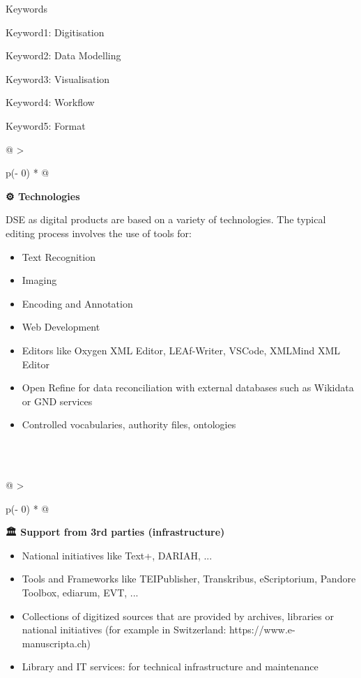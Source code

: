 \documentclass[
  letterpaper,
  DIV=11,
  numbers=noendperiod]{scrreprt}
\begin{document}
Keywords

Keyword1: Digitisation

Keyword2: Data Modelling

Keyword3: Visualisation

Keyword4: Workflow

Keyword5: Format

\begin{longtable}[]{@{}
  >{\raggedright\arraybackslash}p{(\columnwidth - 0\tabcolsep) * }@{}}
\toprule\noalign{}
\begin{minipage}[b]{\linewidth}\raggedright
\textbf{⚙️ Technologies} \textbar{}

DSE as digital products are based on a variety of technologies. The
typical editing process involves the use of tools for:

\begin{itemize}
\item
  Text Recognition
\item
  Imaging
\item
  Encoding and Annotation
\item
  Web Development
\item
  Editors like Oxygen XML Editor, LEAf-Writer, VSCode, XMLMind XML
  Editor
\item
  Open Refine for data reconciliation with external databases such as
  Wikidata or GND services
\item
  Controlled vocabularies, authority files, ontologies
\end{itemize}
\end{minipage} \\
\midrule\noalign{}
\endhead
\bottomrule\noalign{}
\endlastfoot
 \\
\end{longtable}

\begin{longtable}[]{@{}
  >{\raggedright\arraybackslash}p{(\columnwidth - 0\tabcolsep) * }@{}}
\toprule\noalign{}
\begin{minipage}[b]{\linewidth}\raggedright
\textbf{🏛️ Support from 3rd parties (infrastructure)} \textbar{}

\begin{itemize}
\item
  National initiatives like Text+, DARIAH, ...
\item
  Tools and Frameworks like TEIPublisher, Transkribus, eScriptorium,
  Pandore Toolbox, ediarum, EVT, ...
\item
  Collections of digitized sources that are provided by archives,
  libraries or national initiatives (for example in Switzerland:
  https://www.e-manuscripta.ch)
\item
  Library and IT services: for technical infrastructure and maintenance
\end{itemize}
\end{minipage} \\
\midrule\noalign{}
\endhead
\bottomrule\noalign{}
\endlastfoot
 \\
\end{longtable}
\end{document}
